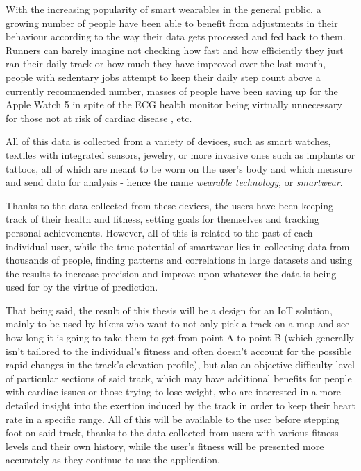 With the increasing popularity of smart wearables in the general public, a growing number of people have been able to benefit from adjustments in their behaviour according to the way their data gets processed and fed back to them.
Runners can barely imagine not checking how fast and how efficiently they just ran their daily track or how much they have improved over the last month,
people with sedentary jobs attempt to keep their daily step count above a currently recommended number,
masses of people have been saving up for the Apple Watch 5 \cite{AppleWatch5} in spite of the ECG health monitor being virtually unnecessary for those not at risk of cardiac disease \cite{ecg-screening}, etc.

All of this data is collected from a variety of devices, such as smart watches, textiles with integrated sensors, jewelry, or more invasive ones such as implants or tattoos, all of which are meant to be worn on the user's body and which measure and send data for analysis - hence the name \textit{wearable technology}, or \textit{smartwear}. \cite{what-is-wearable-tech}

Thanks to the data collected from these devices, the users have been keeping track of their health and fitness, setting goals for themselves and tracking personal achievements.
However, all of this is related to the past of each individual user, while the true potential of smartwear lies in collecting data from thousands of people,
finding patterns and correlations in large datasets and using the results to increase precision and improve upon whatever the data is being used for by the virtue of prediction.

That being said, the result of this thesis will be a design for an IoT solution, mainly to be used by hikers who want to not only pick a track on a map and see how long it is going to take them to get from point A to point B (which generally isn't tailored to the individual's fitness and often doesn't account for the possible rapid changes in the track's elevation profile),
but also an objective difficulty level of particular sections of said track, which may have additional benefits for people with cardiac issues or those trying to lose weight, who are interested in a more detailed insight into the exertion induced by the track in order to keep their heart rate in a specific range.
All of this will be available to the user before stepping foot on said track, thanks to the data collected from users with various fitness levels and their own history,
while the user's fitness will be presented more accurately as they continue to use the application.

